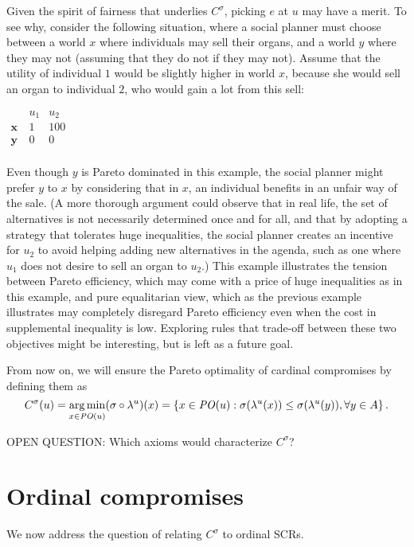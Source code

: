 \documentclass[version=3.21, pagesize, notitlepage, twoside=off, bibliography=totoc, DIV=calc, fontsize=12pt, a4paper]{scrartcl}
\newcommand{\paretopt}{\mathit{PO}}
\begin{document}
\begin{remark}
	Given the spirit of fairness that underlies $C^{\sigma }$, picking $e$ at $u$ may have a merit. To see why, consider the following situation, where a social planner must choose between a world $x$ where individuals may sell their organs, and a world $y$ where they may not (assuming that they do not if they may not). Assume that the utility of individual $1$ would be slightly higher in world $x$, because she would sell an organ to individual $2$, who would gain a lot from this sell: 
	\begin{center}
		$
		\begin{array}{ccc}
		& u_1 & u_2 \\
		\mathbf{x} \ & 1 & 100 \\
		\mathbf{y} \ & 0 & 0 \\
		\end{array}
		$
	\end{center}
	Even though $y$ is Pareto dominated in this example, the social planner might prefer $y$ to $x$ by considering that in $x$, an individual benefits in an unfair way of the sale. (A more thorough argument could observe that in real life, the set of alternatives is not necessarily determined once and for all, and that by adopting a strategy that tolerates huge inequalities, the social planner creates an incentive for $u_2$ to avoid helping adding new alternatives in the agenda, such as one where $u_1$ does not desire to sell an organ to $u_2$.)  This example illustrates the tension between Pareto efficiency, which may come with a price of huge inequalities as in this example, and pure equalitarian view, which as the previous example illustrates may completely disregard Pareto efficiency even when the cost in supplemental inequality is low. Exploring rules that trade-off between these two objectives might be interesting, but is left as a future goal.
\end{remark}
From now on, we will ensure the Pareto optimality of cardinal compromises by defining them as 
\[C^{\sigma }(u) = \argmin_{x \in \paretopt(u)} (\sigma \circ \lambda^u)(x) = \left\{ x\in \paretopt(u):\sigma (\lambda ^{u}(x))\leq \sigma (\lambda ^{u}(y)),  \forall y\in A\right\}.\]

OPEN QUESTION: Which axioms would characterize $C^{\sigma }$?

\section{Ordinal compromises} 
We now address the question of relating $C^{\sigma }$ to ordinal SCRs.
\end{document}
